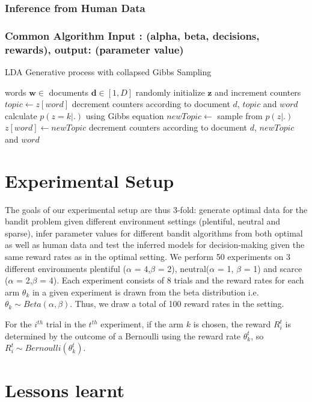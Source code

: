 \subsubsection{Inference from Human Data}


\subsubsection{Common Algorithm Input : (alpha, beta, decisions, rewards), output: (parameter value)}
\label{appendixAlgo}
\begin{algorithm}[H]
\caption{LDA Generative process with collapsed Gibbs Sampling }
\label{generativeLDA_algorithm}
\renewcommand{\algorithmicrequire}{\textbf{Input:}}
\renewcommand{\algorithmicensure}{\textbf{Output:}}
\begin{algorithmic}[1]
		\REQUIRE words $\bm{w} \in $ documents $\bm{d} \in [1,D]$
			\STATE randomly initialize $\bm{z}$ and increment counters
					\STATE $topic \leftarrow z[word]$
					\STATE decrement counters according to document $d$, $topic$ and $word$
						\STATE calculate $p(z=k|.) $ using Gibbs equation
					\ENDFOR
					\STATE $newTopic \leftarrow $ sample from $p(z|.)$
					\STATE $z[word] \leftarrow newTopic$
					\STATE decrement counters according to document $d$, $newTopic$ and $word$
				\ENDFOR
			\ENDFOR
		\ENDFOR
\end{algorithmic}
\end{algorithm}
	

\section{Experimental Setup}
The goals of our experimental setup are thus 3-fold: generate optimal data for the bandit problem given different environment settings (plentiful, neutral and sparse), infer parameter values for different bandit algorithms from both optimal as well as human data and test the inferred models for decision-making given the same reward rates as in the optimal setting. 
We perform 50 experiments on 3 different environments plentiful ($\alpha$ = 4,$\beta$ = 2), neutral($\alpha$ = 1, $\beta$ = 1) and scarce ($\alpha$ = 2,$\beta$ = 4). Each experiment consists of 8 trials and the reward rates for each arm $\theta_k$ in a given experiment is drawn from the beta distribution i.e. $\theta_k \sim Beta (\alpha, \beta)$. Thus, we draw a total of 100 reward rates in the setting. 

For the $i^{th}$ trial in the $t^{th}$ experiment, if the arm $k$ is chosen, the reward $R_i^t$ is determined by the outcome of a Bernoulli using the reward rate $\theta_k^t$, so $R_i^t \sim Bernoulli (\theta_k^t)$.


\section{Lessons learnt}